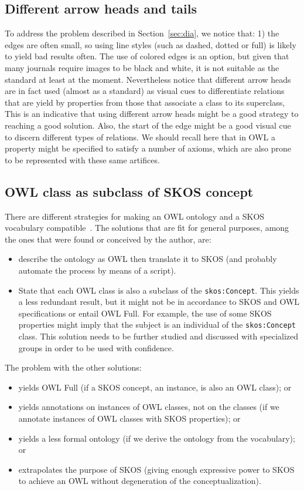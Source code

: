 \documentclass[12pt,fleqn]{article}
\begin{document}
\subsection{Different arrow heads and tails}
To address the problem described in Section~\ref{sec:dia},
we notice that: 1) the edges are often small, so using line styles
(such as dashed, dotted or full) is likely to yield bad results often.
The use of colored edges is an option, but given that many
journals require images to be black and white, it is not suitable
as the standard at least at the moment.
Nevertheless notice that different arrow heads are in fact used (almost as a standard) 
as visual cues
to differentiate relations that are yield by properties from those
that associate a class to its superclass,
This is an indicative that using different arrow heads might
be a good strategy to reaching a good solution.
Also, the start of the edge might be a good visual cue to
discern different types of relations.
We should recall here that in OWL a property might be specified to
satisfy a number of axioms, which are also prone to be represented
with these same artifices.

\subsection{OWL class as subclass of SKOS concept}\label{owlSkos}
There are different
strategies for making an OWL ontology and a SKOS vocabulary compatible~\citep{owlSkos}.
The solutions that are fit for general purposes, among the ones that were found or conceived by the author, are:
\begin{itemize}
	\item describe the ontology as OWL then translate it to SKOS (and probably automate the process by means of a script).
	\item State that each OWL class is also a subclass of the \texttt{skos:Concept}.
		This yields a less redundant result, but it might not be in accordance to SKOS and OWL specifications
		or entail OWL Full.
		For example, the use of some SKOS properties might imply that the subject is an individual of the \texttt{skos:Concept} class.
		This solution needs to be further studied and discussed with specialized groups in order to be used with confidence.
\end{itemize}

The problem with the other solutions:
\begin{itemize}
	\item yields OWL Full (if a SKOS concept, an instance, is also an OWL class); or
	\item yields annotations on instances of OWL classes, not on the classes
		(if we annotate instances of OWL classes with SKOS properties); or
	\item yields a less formal ontology (if we derive the ontology from the vocabulary); or
	\item extrapolates the purpose of SKOS
		(giving enough expressive power to SKOS to achieve an OWL without degeneration of the conceptualization).
\end{itemize}
\end{document}
